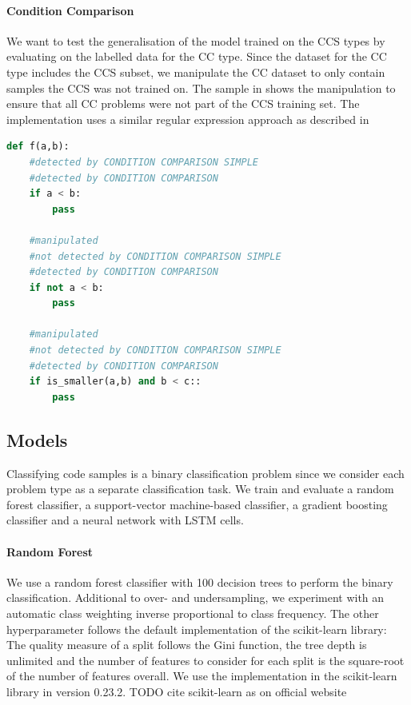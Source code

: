 \paragraph{Condition Comparison}\label{par:manipulation_condition_comparison}
We want to test the generalisation of the model trained on the CCS types by evaluating on the labelled data for the CC type. 
Since the dataset for the CC type includes the CCS subset, we manipulate the CC dataset to only contain samples the CCS was not trained on. The sample in  shows the manipulation to ensure that all CC problems were not part of the CCS training set. The implementation uses a similar regular expression approach as described in 

\begin{lstlisting}[language=Python, label=lst:conidtion_comparison_modified, caption={Sample statements for the differnce between the two analysis plugins CC and CCS.  }]
    def f(a,b):
    #detected by CONDITION COMPARISON SIMPLE
    #detected by CONDITION COMPARISON
    if a < b:
        pass 

    #manipulated
    #not detected by CONDITION COMPARISON SIMPLE
    #detected by CONDITION COMPARISON
    if not a < b:
        pass 

    #manipulated
    #not detected by CONDITION COMPARISON SIMPLE
    #detected by CONDITION COMPARISON
    if is_smaller(a,b) and b < c::
        pass \end{lstlisting}

\subsection{Models}
Classifying code samples is a binary classification problem since we consider each problem type as a separate classification task. We train and evaluate a random forest classifier, a support-vector machine-based classifier, a gradient boosting classifier and a neural network with LSTM cells.

\paragraph{Random Forest}
We use a random forest classifier with 100 decision trees to perform the binary classification. Additional to over- and undersampling, we experiment with an automatic class weighting inverse proportional to class frequency. The other hyperparameter follows the default implementation of the scikit-learn library: The quality measure of a split follows the Gini function, the tree depth is unlimited and the number of features to consider for each split is the square-root of the number of features overall. We use the implementation in the scikit-learn library in version 0.23.2. TODO cite scikit-learn as on official website
